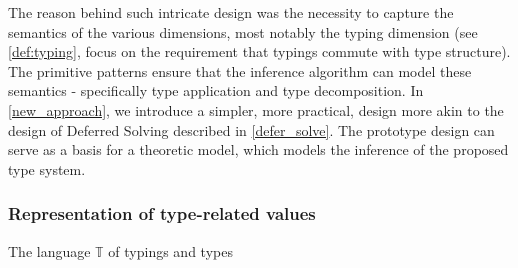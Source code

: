 The reason behind such intricate design was the necessity to capture the semantics of the various dimensions, most notably the typing dimension (see \cref{def:typing}, focus on the requirement that typings commute with type structure). The primitive patterns ensure that the inference algorithm can model these semantics - specifically type application and type decomposition. In \cref{new_approach}, we introduce a simpler, more practical, design more akin to the design of Deferred Solving described in \cref{defer_solve}. The prototype design can serve as a basis for a theoretic model, which models the inference of the proposed type system.

\subsubsection{Representation of type-related values}

\label{def:tyvar}
\label{typing_gram}
\label{def:primpat}
\label{const_kind_def}
\label{def:properties}

\begin{lang}
  \def\grammarP{0.6}
  \begin{grammar}
  \end{grammar}
  \caption{The language $\mathbb{T}$ of typings and types}
  \label{lang:typing}
\end{lang}

